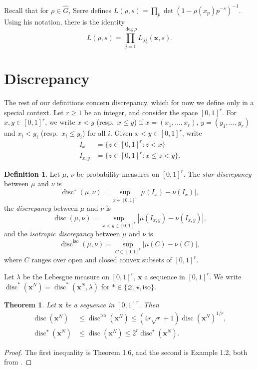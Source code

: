 \documentclass{article}
\DeclareMathOperator{\disc}{disc}
\newcommand{\bx}{{\boldsymbol x}}
\newcommand{\iso}{\mathrm{iso}}
\newtheorem{theorem}[subsection]{Theorem}
\theoremstyle{definition}
\newtheorem{definition}[subsection]{Definition}
\begin{document}
Recall that for $\rho\in \widehat G$, Serre defines 
$L(\rho,s) = \prod_p \det(1-\rho(x_p) p^{-s})^{-1}$. Using his notation, there 
is the identity 
\[
	L(\rho,s) = \prod_{j=1}^{\deg\rho} L_{\lambda_\rho^j}(\bx,s) .
\]





\section{Discrepancy}\label{sec:discrepancy}

The rest of our definitions concern discrepancy, which for now we define only 
in a special context. Let $r\geqslant 1$ be an integer, and consider the space 
$[0,1]^r$. For $x,y\in [0,1]^r$, we write $x<y$ (resp.~$x\leqslant y$) if 
$x=(x_1,\dots,x_r)$, $y=(y_1,\dots,y_r)$ and $x_i<y_i$ 
(resp.~$x_i\leqslant y_i$) for all $i$. Given $x<y\in [0,1]^r$, write 
\begin{align*}
	I_x &= \{z\in [0,1]^r : z<x\} \\
	I_{x,y} &= \{z\in [0,1]^r : x\leqslant z<y\} .
\end{align*}

\begin{definition}
Let $\mu$, $\nu$ be probability measures on $[0,1]^r$. The 
\emph{star-discrepancy} between $\mu$ and $\nu$ is 
\[
	\disc^\star(\mu,\nu) = \sup_{x\in [0,1]^r} |\mu(I_x)-\nu(I_x)| ,
\]
the \emph{discrepancy} between $\mu$ and $\nu$ is 
\[
	\disc(\mu,\nu) = \sup_{x<y\in [0,1]^r} |\mu(I_{x,y})-\nu(I_{x,y})| ,
\]
and the \emph{isotropic discrepancy} between $\mu$ and $\nu$ is 
\[
	\disc^\iso(\mu,\nu) = \sup_{C\subset [0,1]^r} |\mu(C)-\nu(C)| ,
\]
where $C$ ranges over open and closed convex subsets of $[0,1]^r$. 
\end{definition}

Let $\lambda$ be the Lebesgue measure on $[0,1]^r$, $\bx$ a sequence in 
$[0,1]^r$. We write $\disc^\ast(\bx^N)=\disc^\ast(\bx^N,\lambda)$ for 
$\ast\in \{\varnothing,\star,\iso\}$. 

\begin{theorem}\label{thm:discrepancy-related}
Let $\bx$ be a sequence in $[0,1]^r$. Then 
\begin{align*}
	\disc(\bx^N) &\leqslant \disc^\iso(\bx^N) \leqslant (4 r \sqrt r+1) \disc(\bx^N)^{1/r} ,\\
	\disc^\star(\bx^N) &\leqslant \disc(\bx^N) \leqslant 2^r \disc^\star(\bx^N) .
\end{align*}
\end{theorem}
\begin{proof}
The first inequality is Theorem 1.6, and the second is Example 1.2, both from 
\cite[Ch.2]{kuipers-niederreiter-1974}. 
\end{proof}
\end{document}
